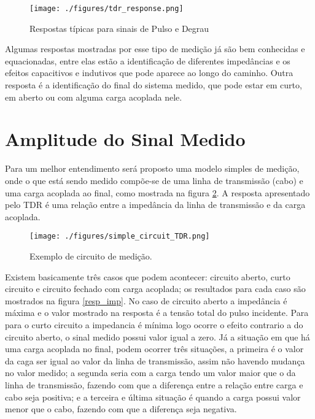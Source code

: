 \begin{figure}[htb!]
	\begin{center}
		\texttt{[image: ./figures/tdr\_response.png]}
		\caption{Respostas típicas para sinais de Pulso e Degrau }
		\label{respostas}
	\end{center}
\end{figure}

Algumas respostas mostradas por esse tipo de medição já são bem conhecidas e equacionadas, entre elas estão a identificação de diferentes impedâncias e os efeitos capacitivos e indutivos que pode aparece ao longo do caminho. Outra resposta é a identificação do final do sistema medido, que pode estar em curto, em aberto ou com alguma carga acoplada nele. 

\section{Amplitude do Sinal Medido}

Para um melhor entendimento será proposto uma modelo simples de medição, onde o que está sendo medido compõe-se de uma linha de transmissão (cabo) e uma carga acoplada ao final, como mostrada na figura \ref{circuito_simples}. A resposta apresentado pelo TDR é uma relação entre a impedância da linha de transmissão e da carga acoplada.

\begin{figure}[htb!]
	\begin{center}
		\texttt{[image: ./figures/simple\_circuit\_TDR.png]}
		\caption{Exemplo de circuito de medição.}
		\label{circuito_simples}
	\end{center}	
\end{figure}

Existem basicamente três casos que podem acontecer: circuito aberto, curto circuito e circuito fechado com carga acoplada; os resultados para cada caso são mostrados na figura \ref{resp_imp}. No caso de circuito aberto a impedância é máxima e o valor mostrado na resposta é a tensão total do pulso incidente. Para para o curto circuito a impedancia é mínima logo ocorre o efeito contrario a do circuito aberto, o sinal medido possui valor igual a zero. Já a situação em que há uma carga acoplada no final, podem ocorrer três situações, a primeira é o valor da caga ser igual ao valor da linha de transmissão, assim não havendo mudança no valor medido; a segunda seria com a carga tendo um valor maior que o da linha de transmissão, fazendo com que a diferença entre a relação entre carga e cabo seja positiva; e a terceira e última situação é quando a carga possui valor menor que o cabo, fazendo com que a diferença seja negativa.



